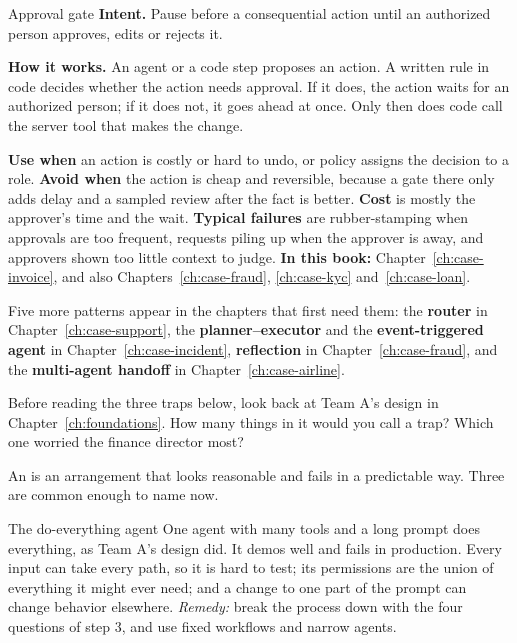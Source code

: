 \begin{patterncard}{Approval gate}
\textbf{Intent.} Pause before a consequential action until an authorized person approves, edits or rejects it.\par\smallskip
\textbf{How it works.} An agent or a code step proposes an action. A written rule in code decides whether the action needs approval. If it does, the action waits for an authorized person; if it does not, it goes ahead at once. Only then does code call the server tool that makes the change.\par\smallskip
\textbf{Use when} an action is costly or hard to undo, or policy assigns the decision to a role. \textbf{Avoid when} the action is cheap and reversible, because a gate there only adds delay and a sampled review after the fact is better. \textbf{Cost} is mostly the approver's time and the wait. \textbf{Typical failures} are rubber-stamping when approvals are too frequent, requests piling up when the approver is away, and approvers shown too little context to judge. \textbf{In this book:} Chapter~\ref{ch:case-invoice}, and also Chapters~\ref{ch:case-fraud}, \ref{ch:case-kyc} and~\ref{ch:case-loan}.
\end{patterncard}

Five more patterns appear in the chapters that first need them: the \textbf{router} in Chapter~\ref{ch:case-support}, the \textbf{planner--executor} and the \textbf{event-triggered agent} in Chapter~\ref{ch:case-incident}, \textbf{reflection} in Chapter~\ref{ch:case-fraud}, and the \textbf{multi-agent handoff} in Chapter~\ref{ch:case-airline}.

\begin{thinkabout}
Before reading the three traps below, look back at Team A's design in Chapter~\ref{ch:foundations}. How many things in it would you call a trap? Which one worried the finance director most?
\end{thinkabout}

An  is an arrangement that looks reasonable and fails in a predictable way. Three are common enough to name now.

\begin{antipattern}{The do-everything agent}
One agent with many tools and a long prompt does everything, as Team A's design did. It demos well and fails in production. Every input can take every path, so it is hard to test; its permissions are the union of everything it might ever need; and a change to one part of the prompt can change behavior elsewhere. \emph{Remedy:} break the process down with the four questions of step 3, and use fixed workflows and narrow agents.
\end{antipattern}

